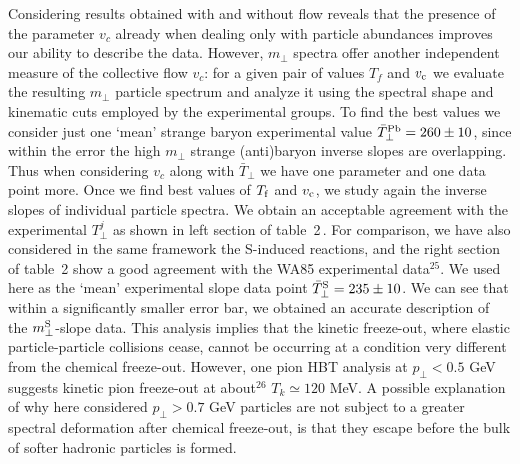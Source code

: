 \begin{mdframed}[linecolor=gray,roundcorner=12pt,backgroundcolor=Dandelion!15,linewidth=1pt,leftmargin=0cm,rightmargin=0cm,topline=true,bottomline=true,skipabove=12pt]
Considering results obtained with and without flow reveals that the presence of the parameter $v_c$ already when dealing only with particle abundances improves our ability to describe the data. However, $m_\bot$ spectra offer another independent measure of the collective flow $v_c$: for a given pair of values $T_{f}$ and $v_{\rm c}$ we evaluate the resulting $m_\bot$ particle spectrum and analyze it using the spectral shape and kinematic cuts employed by the experimental groups. To find the best values we consider just one `mean' strange baryon experimental value ${\bar T}_{\bot}^{\rm Pb}=260\pm10$, since within the error the high $m_\bot$ strange (anti)baryon inverse slopes are overlapping. Thus when considering $v_c$ along with ${\bar T}_{\bot}$ we have one parameter and one data point more. Once we find best values of $T_{\rm f}$ and $v_{\rm c}$, we study again the inverse slopes of individual particle spectra. We obtain an acceptable agreement with the experimental $T_{\bot}^j$ as shown in left section of table~2\,. For comparison, we have also considered in the same framework the S-induced reactions, and the right section of table~2 show a good agreement with the WA85 experimental data$^{25}$. We used here as the `mean' experimental slope data point ${\bar T}_{\bot}^{\rm S}=235\pm10$. We can see that within a significantly smaller error bar, we obtained an accurate description of the $m_\bot^{\rm S}$-slope data. This analysis implies that the kinetic freeze-out, where elastic particle-particle collisions cease, cannot be occurring at a condition very different from the chemical freeze-out. However, one pion HBT analysis at $p_\bot<0.5$ GeV suggests kinetic pion freeze-out at about$^{26}$ $T_k\simeq120$ MeV. A possible explanation of why here considered $p_\bot>0.7$ GeV particles are not subject to a greater spectral deformation after chemical freeze-out, is that they escape before the bulk of softer hadronic particles is formed.\\


\end{mdframed}
